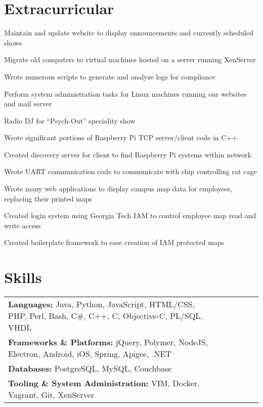 \documentclass[line]{resume}
\begin{document}
\section{Extracurricular}
\begin{myitemize}
	\item Maintain and update website to display announcements and currently scheduled shows 
	\item Migrate old computers to virtual machines hosted on a server running XenServer 
	\item Wrote numerous scripts to generate and analyze logs for compliance
	\item Perform system administration tasks for Linux machines running our websites and mail server 
	\item Radio DJ for ``Psych-Out'' speciality show
\end{myitemize}

\begin{myitemize}
	\item Wrote significant portions of Raspberry Pi TCP server/client code in C++ 
	\item Created discovery server for client to find Raspberry Pi systems within network 
	\item Wrote UART communication code to communicate with chip controlling rat cage 
\end{myitemize}

\begin{myitemize}
	\item Wrote many web applications to display campus map data for employees, replacing their printed maps
	\item Created login system using Georgia Tech IAM to control employee map read and write access 
	\item Created boilerplate framework to ease creation of IAM protected maps 
\end{myitemize}
\section{Skills}
\begin{tabular}{l l l l l l}
	\textbf{Languages:} Java, Python, JavaScript, HTML/CSS, PHP, Perl, Bash, C\#, C++, C, Objective-C, PL/SQL, VHDL \\
	\textbf{Frameworks \& Platforms:} jQuery, Polymer, NodeJS, Electron, Android, iOS, Spring, Apigee, .NET \\
	\textbf{Databases:} PostgreSQL, MySQL, Couchbase \\
	\textbf{Tooling \& System Administration:}  VIM, Docker, Vagrant, Git, XenServer \\
\end{tabular}
\end{document}
